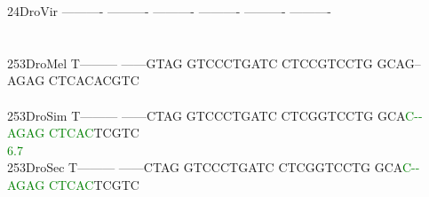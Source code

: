 \documentclass[11pt,twoside,reqno,a4paper]{article}
\begin{document}
{24\hspace*{2\charwidth}DroVir	----------	----------	----------	----------	----------	----------	\\
\hspace*{4\charwidth}\hspace*{7\charwidth}\hspace*{1\charwidth}\hspace*{1\charwidth}\hspace*{1\charwidth}\hspace*{1\charwidth}\hspace*{1\charwidth}\hspace*{1\charwidth}\\
\\
253\hspace*{1\charwidth}DroMel	T---------	------GTAG	GTCCCTGATC	CTCCGTCCTG	GCAG--AGAG	CTCACACGTC	\\
\hspace*{4\charwidth}\hspace*{7\charwidth}\hspace*{1\charwidth}\hspace*{1\charwidth}\hspace*{1\charwidth}\hspace*{1\charwidth}\hspace*{1\charwidth}\hspace*{1\charwidth}\\
253\hspace*{1\charwidth}DroSim	T---------	------CTAG	GTCCCTGATC	CTCGGTCCTG	GCA\textcolor{green}{C}\textcolor{green}{-}\textcolor{green}{-}\textcolor{green}{A}\textcolor{green}{G}\textcolor{green}{A}\textcolor{green}{G}	\textcolor{green}{C}\textcolor{green}{T}\textcolor{green}{C}\textcolor{green}{A}\textcolor{green}{C}TCGTC	\\
\hspace*{4\charwidth}\hspace*{7\charwidth}\hspace*{1\charwidth}\hspace*{1\charwidth}\hspace*{1\charwidth}\hspace*{1\charwidth}\hspace*{43\charwidth}\textcolor{green}{6.7}\hspace*{1\charwidth}\hspace*{1\charwidth}\\
253\hspace*{1\charwidth}DroSec	T---------	------CTAG	GTCCCTGATC	CTCGGTCCTG	GCA\textcolor{green}{C}\textcolor{green}{-}\textcolor{green}{-}\textcolor{green}{A}\textcolor{green}{G}\textcolor{green}{A}\textcolor{green}{G}	\textcolor{green}{C}\textcolor{green}{T}\textcolor{green}{C}\textcolor{green}{A}\textcolor{green}{C}TCGTC	\\
}
\end{document}
